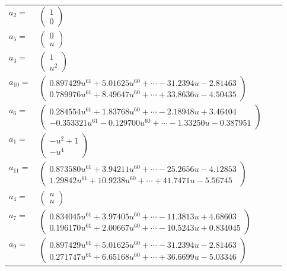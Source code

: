 \documentclass[1p]{elsarticle_modified}
\theoremstyle{definition}
\begin{document}
\begin{tabular}{m{7pt} m{180pt} m{7pt} m{180pt} }
\flushright $a_{2}=$&$\begin{pmatrix}1\\0\end{pmatrix}$ \\
\flushright $a_{5}=$&$\begin{pmatrix}0\\u\end{pmatrix}$ \\
\flushright $a_{3}=$&$\begin{pmatrix}1\\u^2\end{pmatrix}$ \\
\flushright $a_{10}=$&$\begin{pmatrix}0.897429 u^{61}+5.01625 u^{60}+\cdots-31.2394 u-2.81463\\0.789976 u^{61}+8.49647 u^{60}+\cdots+33.8636 u-4.50435\end{pmatrix}$ \\
\flushright $a_{6}=$&$\begin{pmatrix}0.284554 u^{61}+1.83768 u^{60}+\cdots-2.18948 u+3.46404\\-0.353321 u^{61}-0.129700 u^{60}+\cdots-1.33250 u-0.387951\end{pmatrix}$ \\
\flushright $a_{1}=$&$\begin{pmatrix}- u^2+1\\- u^4\end{pmatrix}$ \\
\flushright $a_{11}=$&$\begin{pmatrix}0.873580 u^{61}+3.94211 u^{60}+\cdots-25.2656 u-4.12853\\1.29842 u^{61}+10.9238 u^{60}+\cdots+41.7471 u-5.56745\end{pmatrix}$ \\
\flushright $a_{4}=$&$\begin{pmatrix}u\\u\end{pmatrix}$ \\
\flushright $a_{7}=$&$\begin{pmatrix}0.834045 u^{61}+3.97405 u^{60}+\cdots-11.3813 u+4.68603\\0.196170 u^{61}+2.00667 u^{60}+\cdots-10.5243 u+0.834045\end{pmatrix}$ \\
\flushright $a_{9}=$&$\begin{pmatrix}0.897429 u^{61}+5.01625 u^{60}+\cdots-31.2394 u-2.81463\\0.271747 u^{61}+6.65168 u^{60}+\cdots+36.6699 u-5.03346\end{pmatrix}$ \\

\end{tabular}
\end{document}
